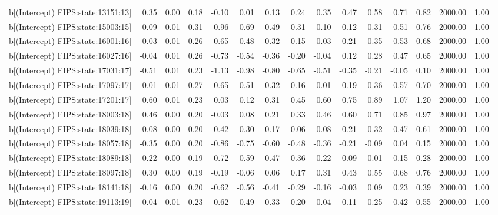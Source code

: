 \begin{table}[ht]
\begin{tabular}{rrrrrrrrrrrrrrr}
  b[(Intercept) FIPS:state:13151:13] & 0.35 & 0.00 & 0.18 & -0.10 & 0.01 & 0.13 & 0.24 & 0.35 & 0.47 & 0.58 & 0.71 & 0.82 & 2000.00 & 1.00 \\ 
  b[(Intercept) FIPS:state:15003:15] & -0.09 & 0.01 & 0.31 & -0.96 & -0.69 & -0.49 & -0.31 & -0.10 & 0.12 & 0.31 & 0.51 & 0.76 & 2000.00 & 1.00 \\ 
  b[(Intercept) FIPS:state:16001:16] & 0.03 & 0.01 & 0.26 & -0.65 & -0.48 & -0.32 & -0.15 & 0.03 & 0.21 & 0.35 & 0.53 & 0.68 & 2000.00 & 1.00 \\ 
  b[(Intercept) FIPS:state:16027:16] & -0.04 & 0.01 & 0.26 & -0.73 & -0.54 & -0.36 & -0.20 & -0.04 & 0.12 & 0.28 & 0.47 & 0.65 & 2000.00 & 1.00 \\ 
  b[(Intercept) FIPS:state:17031:17] & -0.51 & 0.01 & 0.23 & -1.13 & -0.98 & -0.80 & -0.65 & -0.51 & -0.35 & -0.21 & -0.05 & 0.10 & 2000.00 & 1.00 \\ 
  b[(Intercept) FIPS:state:17097:17] & 0.01 & 0.01 & 0.27 & -0.65 & -0.51 & -0.32 & -0.16 & 0.01 & 0.19 & 0.36 & 0.57 & 0.70 & 2000.00 & 1.00 \\ 
  b[(Intercept) FIPS:state:17201:17] & 0.60 & 0.01 & 0.23 & 0.03 & 0.12 & 0.31 & 0.45 & 0.60 & 0.75 & 0.89 & 1.07 & 1.20 & 2000.00 & 1.00 \\ 
  b[(Intercept) FIPS:state:18003:18] & 0.46 & 0.00 & 0.20 & -0.03 & 0.08 & 0.21 & 0.33 & 0.46 & 0.60 & 0.71 & 0.85 & 0.97 & 2000.00 & 1.00 \\ 
  b[(Intercept) FIPS:state:18039:18] & 0.08 & 0.00 & 0.20 & -0.42 & -0.30 & -0.17 & -0.06 & 0.08 & 0.21 & 0.32 & 0.47 & 0.61 & 2000.00 & 1.00 \\ 
  b[(Intercept) FIPS:state:18057:18] & -0.35 & 0.00 & 0.20 & -0.86 & -0.75 & -0.60 & -0.48 & -0.36 & -0.21 & -0.09 & 0.04 & 0.15 & 2000.00 & 1.00 \\ 
  b[(Intercept) FIPS:state:18089:18] & -0.22 & 0.00 & 0.19 & -0.72 & -0.59 & -0.47 & -0.36 & -0.22 & -0.09 & 0.01 & 0.15 & 0.28 & 2000.00 & 1.00 \\ 
  b[(Intercept) FIPS:state:18097:18] & 0.30 & 0.00 & 0.19 & -0.19 & -0.06 & 0.06 & 0.17 & 0.31 & 0.43 & 0.55 & 0.68 & 0.76 & 2000.00 & 1.00 \\ 
  b[(Intercept) FIPS:state:18141:18] & -0.16 & 0.00 & 0.20 & -0.62 & -0.56 & -0.41 & -0.29 & -0.16 & -0.03 & 0.09 & 0.23 & 0.39 & 2000.00 & 1.00 \\ 
  b[(Intercept) FIPS:state:19113:19] & -0.04 & 0.01 & 0.23 & -0.62 & -0.49 & -0.33 & -0.20 & -0.04 & 0.11 & 0.25 & 0.42 & 0.55 & 2000.00 & 1.00 \\ 

\end{tabular}
\end{table}
